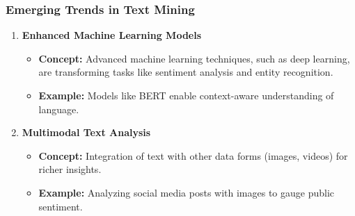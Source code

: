 \documentclass[aspectratio=169]{beamer}
\begin{document}
\begin{frame}[fragile]
  \frametitle{Emerging Trends in Text Mining}
  \begin{enumerate}
    \item \textbf{Enhanced Machine Learning Models}
      \begin{itemize}
        \item \textbf{Concept:} Advanced machine learning techniques, such as deep learning, are transforming tasks like sentiment analysis and entity recognition.
        \item \textbf{Example:} Models like BERT enable context-aware understanding of language.
      \end{itemize}

    \item \textbf{Multimodal Text Analysis}
      \begin{itemize}
        \item \textbf{Concept:} Integration of text with other data forms (images, videos) for richer insights.
        \item \textbf{Example:} Analyzing social media posts with images to gauge public sentiment.
      \end{itemize}
  \end{enumerate}
\end{frame}
\end{document}
